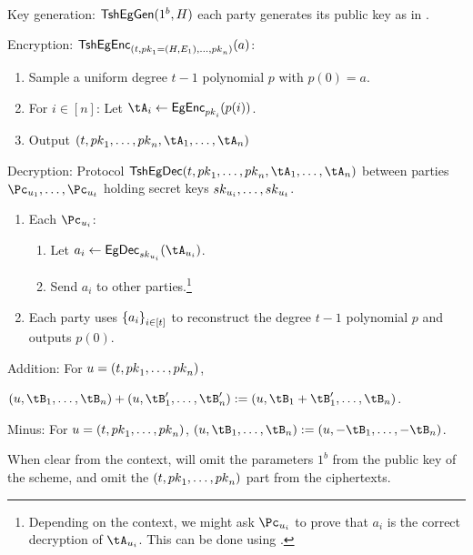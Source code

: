 \begin{algorithm}\label{alg:tsEGinExp}~
	
	
	\item[Key generation:] $\mathsf{TshEgGen}(1^b,H)$ each party generates its public key as in \EgKg.
	
	\item[Encryption:] $\mathsf{TshEgEnc}_{(t,{pk}_1= (H,E_1),\ldots,{pk}_n)}(a)$:
	
	\begin{enumerate}
		\item Sample a uniform degree $t-1$ polynomial  $p$ with $p(0)= a$. 
		
		\item  For $i \in [n]$: Let $\tA_i \asn \EgEnc_{\pk_i}(p(i))$.
		
		
		\item Output $(t,\pk_1,\ldots,\pk_n,\tA_1,\ldots,\tA_n)$
		
	\end{enumerate}
	
	
	\item[Decryption:] Protocol $\tsEgDec(t,\pk_1,\ldots,\pk_n,\tA_1,\ldots,\tA_n)$ between parties  $\Pc_{u_1},\ldots,\Pc_{u_t}$ holding secret keys ${sk}_{u_i}, \ldots,{sk}_{u_t}$.
	
	\begin{enumerate}
		\item 	Each $\Pc_{u_i}$:
		
		\begin{enumerate}
			\item Let  $a_i \asn \EgDec_{\sk_{u_i}} (\tA_{u_i})$.
			
			\item  Send $a_i$ to other parties.\footnote{Depending on the context, we might ask $\Pc_{u_i}$ to prove that $a_i$ is  the correct decryption of $\tA_{u_i}$. This can be  done using   \piZKPOK{\rEgConsSk}.}
		\end{enumerate} 
		
		\item Each party uses $\set{a_i}_{i\in [t]}$ to reconstruct 	the degree $t-1$ polynomial $p$ and  outputs $p(0)$.
		
		
	\end{enumerate}
	
	\item[Addition:] For $u = (t,{pk}_1,\ldots,{pk}_n)$, 
	
	$(u,\tB_1,\ldots,\tB_n) + (u,\tB_1',\ldots,\tB_n') \eqdef (u,\tB_1+\tB_1',\ldots,\tB_n)$.
	
	
	\item[Minus:]  For $u = (t,{pk}_1,\ldots,{pk}_n)$,  $(u,\tB_1,\ldots,\tB_n) \eqdef (u,-\tB_1,\ldots,-\tB_n) $.
	
\end{algorithm}	
When clear from the context,  will omit the parameters $1^b$ from the public key of the scheme, and omit the  $(t,{pk}_1,\ldots,{pk}_n)$ part  from the ciphertexts.


